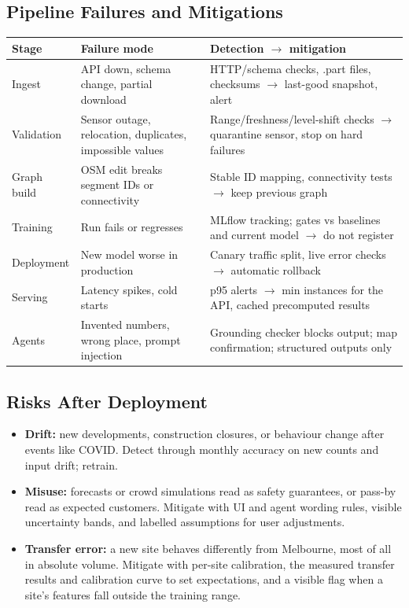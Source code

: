 \documentclass[11pt]{article}
\newcommand{\hrow}{\rowcolor{headgray}}
\begin{document}
\subsection{Pipeline Failures and Mitigations}

\begin{xltabular}{\linewidth}{|L{2.6cm}|Y|Y|}
\hline\hrow
\textbf{Stage} & \textbf{Failure mode} & \textbf{Detection $\rightarrow$ mitigation} \\\hline
\endhead
Ingest & API down, schema change, partial download & HTTP/schema checks, .part files, checksums $\rightarrow$ last-good snapshot, alert \\\hline
Validation & Sensor outage, relocation, duplicates, impossible values & Range/freshness/level-shift checks $\rightarrow$ quarantine sensor, stop on hard failures \\\hline
Graph build & OSM edit breaks segment IDs or connectivity & Stable ID mapping, connectivity tests $\rightarrow$ keep previous graph \\\hline
Training & Run fails or regresses & MLflow tracking; gates vs baselines and current model $\rightarrow$ do not register \\\hline
Deployment & New model worse in production & Canary traffic split, live error checks $\rightarrow$ automatic rollback \\\hline
Serving & Latency spikes, cold starts & p95 alerts $\rightarrow$ min instances for the API, cached precomputed results \\\hline
Agents & Invented numbers, wrong place, prompt injection & Grounding checker blocks output; map confirmation; structured outputs only \\\hline
\end{xltabular}

\subsection{Risks After Deployment}
\begin{itemize}
  \item \textbf{Drift:} new developments, construction closures, or behaviour change after events like COVID. Detect through monthly accuracy on new counts and input drift; retrain.
  \item \textbf{Misuse:} forecasts or crowd simulations read as safety guarantees, or pass-by read as expected customers. Mitigate with UI and agent wording rules, visible uncertainty bands, and labelled assumptions for user adjustments.
  \item \textbf{Transfer error:} a new site behaves differently from Melbourne, most of all in absolute volume. Mitigate with per-site calibration, the measured transfer results and calibration curve to set expectations, and a visible flag when a site's features fall outside the training range.
\end{itemize}
\end{document}
